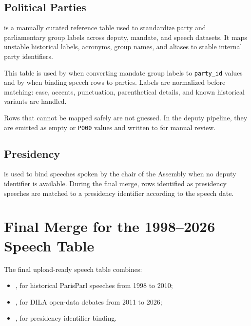 \documentclass[11pt,a4paper]{article}
\begin{document}
\subsection{Political Parties}

 is a manually curated reference table used to
standardize party and parliamentary group labels across deputy, mandate, and
speech datasets. It maps unstable historical labels, acronyms, group names, and
aliases to stable internal party identifiers.

This table is used by  when converting mandate
group labels to \texttt{party\_id} values and by 
when binding speech rows to parties. Labels are normalized before matching:
case, accents, punctuation, parenthetical details, and known historical variants
are handled.

Rows that cannot be mapped safely are not guessed. In the deputy pipeline, they
are emitted as empty or \texttt{P000} values and written to
 for manual review.

\subsection{Presidency}

 is used to bind speeches spoken by the chair
of the Assembly when no deputy identifier is available. During the final merge,
rows identified as presidency speeches are matched to a presidency identifier
according to the speech date.

\section{Final Merge for the 1998--2026 Speech Table}

The final upload-ready speech table combines:

\begin{itemize}
  \item {}, for
  historical ParisParl speeches from 1998 to 2010;
  \item {}, for DILA
  open-data debates from 2011 to 2026;
  \item {}, for presidency identifier binding.
\end{itemize}
\end{document}
